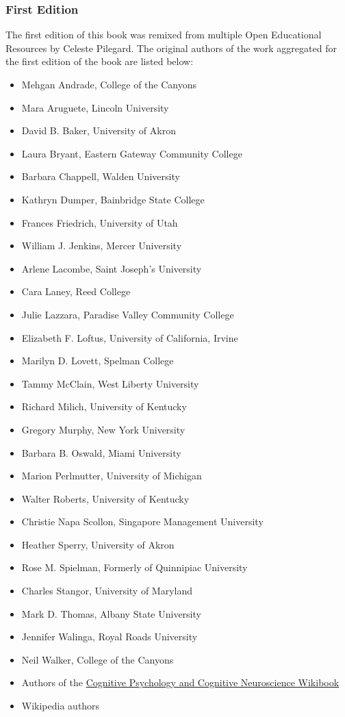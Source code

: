 \documentclass[
]{krantz}
\providecommand{\tightlist}{%
  \setlength{\itemsep}{0pt}\setlength{\parskip}{0pt}}
\begin{document}
\subsubsection*{First Edition}\label{first-edition}


The first edition of this book was remixed from multiple Open Educational Resources by Celeste Pilegard. The original authors of the work aggregated for the first edition of the book are listed below:

\begin{itemize}
\tightlist
\item
  Mehgan Andrade, College of the Canyons
\item
  Mara Aruguete, Lincoln University
\item
  David B. Baker, University of Akron
\item
  Laura Bryant, Eastern Gateway Community College
\item
  Barbara Chappell, Walden University
\item
  Kathryn Dumper, Bainbridge State College
\item
  Frances Friedrich, University of Utah
\item
  William J. Jenkins, Mercer University
\item
  Arlene Lacombe, Saint Joseph's University
\item
  Cara Laney, Reed College
\item
  Julie Lazzara, Paradise Valley Community College
\item
  Elizabeth F. Loftus, University of California, Irvine
\item
  Marilyn D. Lovett, Spelman College
\item
  Tammy McClain, West Liberty University
\item
  Richard Milich, University of Kentucky
\item
  Gregory Murphy, New York University
\item
  Barbara B. Oswald, Miami University
\item
  Marion Perlmutter, University of Michigan
\item
  Walter Roberts, University of Kentucky
\item
  Christie Napa Scollon, Singapore Management University
\item
  Heather Sperry, University of Akron
\item
  Rose M. Spielman, Formerly of Quinnipiac University
\item
  Charles Stangor, University of Maryland
\item
  Mark D. Thomas, Albany State University
\item
  Jennifer Walinga, Royal Roads University
\item
  Neil Walker, College of the Canyons
\item
  Authors of the \href{https://en.wikibooks.org/wiki/Cognitive_Psychology_and_Cognitive_Neuroscience}{Cognitive Psychology and Cognitive Neuroscience Wikibook}
\item
  Wikipedia authors
\end{itemize}
\end{document}
